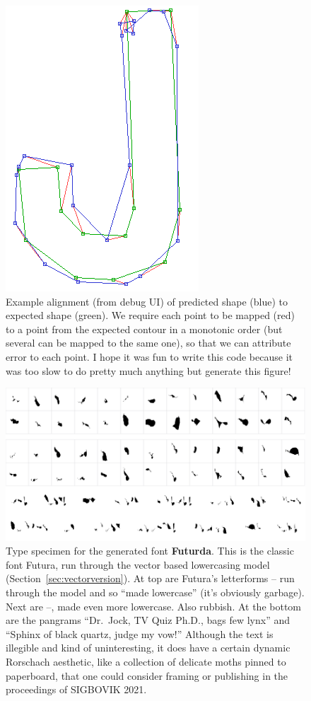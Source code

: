 \documentclass[twocolumn]{amsart}
\begin{document}
\begin{figure}[ht]
\includegraphics[width=0.5 \linewidth]{rotatej}
\caption{ Example alignment (from debug UI) of predicted shape (blue)
  to expected shape (green). We require each point to be mapped (red)
  to a point from the expected contour in a monotonic order (but
  several can be mapped to the same one), so that we can attribute
  error to each point. I hope it was fun to write this code because
  it was too slow to do pretty much anything but generate this figure!
} \label{fig:rotatej}
\end{figure}

\begin{figure}[tp]
\includegraphics[width=0.9 \linewidth]{futurda}
\caption{ Type specimen for the generated font {\bf Futurda}. This is the
  classic font Futura, run through the vector based lowercasing model
  (Section~\ref{sec:vectorversion}). At top are Futura's letterforms
  -- run through the model and so ``made
  lowercase'' (it's obviously garbage). Next are
  --,
  made even more lowercase. Also rubbish.
  At the bottom are the pangrams ``Dr.~Jock, TV Quiz Ph.D., bags few lynx''
  and ``Sphinx of black quartz, judge my vow!'' Although the text is
  illegible and kind of uninteresting, it does have a certain dynamic
  Rorschach aesthetic, like a collection of delicate moths pinned
  to paperboard, that one could consider framing or publishing in
  the proceedings of SIGBOVIK 2021.
} \label{fig:futurda}
\end{figure}
\end{document}
